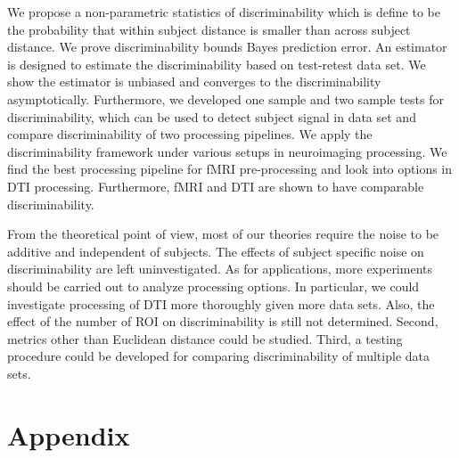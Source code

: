 \documentclass{article}
\begin{document}
 We propose a non-parametric statistics of discriminability which is define to be the probability that within subject distance is smaller than across subject distance.  We prove discriminability bounds Bayes prediction error. An estimator is designed to estimate the discriminability based on test-retest data set. We show the estimator is unbiased and converges to the discriminability asymptotically. Furthermore, we developed one sample and two sample tests for discriminability, which can be used to detect subject signal in data set and compare discriminability of two processing pipelines. We apply the discriminability framework under various setups in neuroimaging processing. We find the best processing pipeline for fMRI pre-processing and look into options in DTI processing. Furthermore, fMRI and DTI are shown to have comparable discriminability.



 From the theoretical point of view, most of our theories require the noise to be additive and independent of subjects. The effects of subject specific noise on discriminability are left uninvestigated. As for applications, more experiments should be carried out to analyze processing options. In particular, we could investigate processing of DTI more thoroughly given more data sets. Also, the effect of the number of ROI on discriminability is still not determined. Second, metrics other than Euclidean distance could be studied. Third, a testing procedure could be developed for comparing discriminability of multiple data sets.



\section{Appendix}


% 
% 
% 
% 
% 
% 
% 
% 
\end{document}
